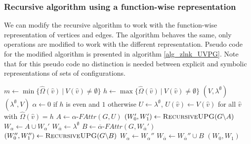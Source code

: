 \subsubsection{Recursive algorithm using a function-wise representation}
We can modify the recursive algorithm to work with the function-wise representation of vertices and edges. The algorithm behaves the same, only operations are modified to work with the different representation.  Pseudo code for the modified algorithm is presented in algorithm \ref{alg_zlnk_UVPG}. Note that for this pseudo code no distinction is needed between explicit and symbolic representations of sets of configurations.
\begin{algorithm}
	\caption{$\textsc{RecursiveUPG}(\textit{PG } G = (\\
		V : \hat{V} \rightarrow 2^\mathfrak{C},\\
		\hat{V}_0 \subseteq \hat{V},\\
		\hat{V}_1 \subseteq \hat{V},\\
		E : \hat{E} \rightarrow 2^\mathfrak{C},\\
		\hat{\Omega} : \hat{V}\rightarrow \mathbb{N}))$}\label{alg_zlnk_UVPG}
	\begin{algorithmic}[1]
		\State $m \gets \min\{ \hat{\Omega}(\hat{v})\ |\ V(\hat{v}) \neq \emptyset \}$
		\State $h \gets \max\{ \hat{\Omega}(\hat{v})\ |\ V(\hat{v}) \neq \emptyset \}$
		\State \Return $(V,\lambda^\emptyset)$
		\Else
		\State \Return $(\lambda^\emptyset, V)$
		\EndIf
		\EndIf
		\State $\alpha \gets 0$ if $h$ is even and $1$ otherwise
		\State $U \gets \lambda^\emptyset$, $U(\hat{v}) \gets V(\hat{v})$ for all $\hat{v}$ with $\hat{\Omega}(\hat{v}) = h$
		\State $A \gets \alpha\textit{-FAttr}(G, U)$
		\State $(W_0', W_1') \gets \textsc{RecursiveUPG}(G \backslash A)$
		\State $W_\alpha \gets A \cup W_\alpha'$
		\State $W_{\overline{\alpha}} \gets \lambda^\emptyset$
		\Else
		\State $B \gets \overline{\alpha}\textit{-FAttr}(G,W_{\overline{\alpha}}')$
		\State $(W_0'', W_1'') \gets \textsc{RecursiveUPG}(G \backslash B)$
		\State $W_\alpha \gets W_\alpha''$
		\State $W_{\overline{\alpha}} \gets W_{\overline{\alpha}}'' \cup B$
		\EndIf
		\State \Return $(W_0, W_1)$
	\end{algorithmic}
\end{algorithm}

